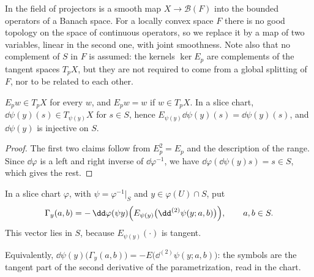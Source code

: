 \begin{remark}
  In \cite{Lar26} the field of projectors is a smooth map $X \to \mathcal B(F)$ into the bounded
  operators of a Banach space. For a locally convex space $F$ there is no good topology on the
  space of continuous operators, so we replace it by a map of two variables, linear in the second
  one, with joint smoothness. Note also that no complement of $S$ in $F$ is assumed: the kernels
  $\ker E_p$ are complements of the tangent spaces $T_p X$, but they are not required to come from
  a global splitting of $F$, nor to be related to each other.
\end{remark}

\begin{lemma}
  \label{lem:projector-tangent}
  \leanok
  $E_p w \in T_p X$ for every $w$, and $E_p w = w$ if $w \in T_p X$. In a slice chart,
  $\dd\psi(y)(s) \in T_{\psi(y)} X$ for $s \in S$, hence $E_{\psi(y)}\dd\psi(y)(s) = \dd\psi(y)(s)$,
  and $\dd\psi(y)$ is injective on $S$.
\end{lemma}

\begin{proof}
  \leanok
  The first two claims follow from $E_p^2 = E_p$ and the description of the range. Since
  $\dd\varphi$ is a left and right inverse of $\dd\varphi^{-1}$, we have
  $\dd\varphi(\dd\psi(y) s) = s \in S$, which gives the rest.
\end{proof}

\begin{definition}
  \label{def:projector-symbols}
  \leanok
  In a slice chart $\varphi$, with $\psi = \varphi^{-1}|_S$ and $y \in \varphi(U) \cap S$, put
  \[
    \Gamma_y(a, b) = -\,\dd\varphi(\psi y)\Bigl(E_{\psi(y)}\bigl(\dd^{(2)}\psi(y; a, b)\bigr)\Bigr),
    \qquad a, b \in S .
  \]
  This vector lies in $S$, because $E_{\psi(y)}(\cdot)$ is tangent.
\end{definition}

Equivalently, $\dd\psi(y)\bigl(\Gamma_y(a, b)\bigr) = -E\bigl(\dd^{(2)}\psi(y; a, b)\bigr)$: the
symbols are the tangent part of the second derivative of the parametrization, read in the chart.

